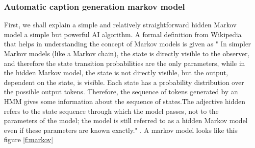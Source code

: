\documentclass[sigconf]{acmart}
\begin{document}
\subsubsection{Automatic caption generation markov model}

First, we shall explain a simple and relatively straightforward hidden Markov model a simple but powerful AI algorithm. A formal definition from Wikipedia that helps in understanding the concept of Markov models is given as " In simpler Markov models (like a Markov chain), the state is directly visible to the observer, and therefore the state transition probabilities are the only parameters, while in the hidden Markov model, the state is not directly visible, but the output, dependent on the state, is visible. Each state has a probability distribution over the possible output tokens. Therefore, the sequence of tokens generated by an HMM gives some information about the sequence of states.The adjective hidden refers to the state sequence through which the model passes, not to the parameters of the model; the model is still referred to as a hidden Markov model even if these parameters are known exactly." \cite{Wikipedia2017a}. A markov model looks like this figure \ref{f:markov}
\end{document}
